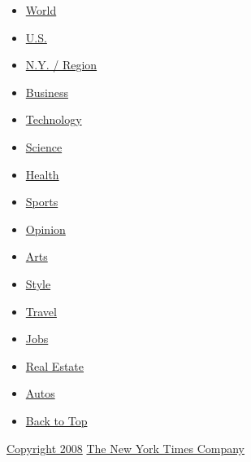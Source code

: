 \begin{itemize}
\tightlist
\item
  \href{//www.nytimes3xbfgragh.onion/pages/world/index.html}{World}
\item
  \href{//www.nytimes3xbfgragh.onion/pages/national/index.html}{U.S.}
\item
  \href{//www.nytimes3xbfgragh.onion/pages/nyregion/index.html}{N.Y. /
  Region}
\item
  \href{//www.nytimes3xbfgragh.onion/pages/business/index.html}{Business}
\item
  \href{//tech.nytimes3xbfgragh.onion/pages/technology/index.html}{Technology}
\item
  \href{//www.nytimes3xbfgragh.onion/pages/science/index.html}{Science}
\item
  \href{//www.nytimes3xbfgragh.onion/pages/health/index.html}{Health}
\item
  \href{//www.nytimes3xbfgragh.onion/pages/sports/index.html}{Sports}
\item
  \href{//www.nytimes3xbfgragh.onion/pages/opinion/index.html}{Opinion}
\item
  \href{//www.nytimes3xbfgragh.onion/pages/arts/index.html}{Arts}
\item
  \href{//www.nytimes3xbfgragh.onion/pages/style/index.html}{Style}
\item
  \href{//travel.nytimes3xbfgragh.onion}{Travel}
\item
  \href{//jobmarket.nytimes3xbfgragh.onion/pages/jobs/index.html}{Jobs}
\item
  \href{//www.nytimes3xbfgragh.onion/pages/realestate/index.html}{Real
  Estate}
\item
  \href{//www.nytimes3xbfgragh.onion/pages/automobiles/index.html}{Autos}
\item
  \protect\hyperlink{top}{Back to Top}
\end{itemize}

\href{//www.nytimes3xbfgragh.onion/ref/membercenter/help/copyright.html}{Copyright
2008} \href{//www.nytco.com/}{The New York Times Company}

